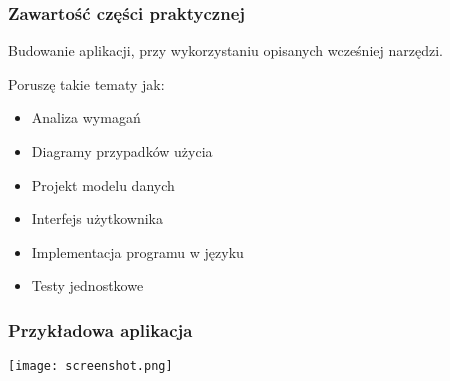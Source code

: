 \begin{frame}
\frametitle{Zawartość części praktycznej}
Budowanie aplikacji, przy wykorzystaniu opisanych wcześniej narzędzi.

Poruszę takie tematy jak:
\begin{itemize}
\item Analiza wymagań
\item Diagramy przypadków użycia
\item Projekt modelu danych
\item Interfejs użytkownika
\item Implementacja programu w języku \Csharp
\item Testy jednostkowe
\end{itemize}
\end{frame}

\begin{frame}
\frametitle{Przykładowa aplikacja}
 \texttt{[image: screenshot.png]}
\end{frame}